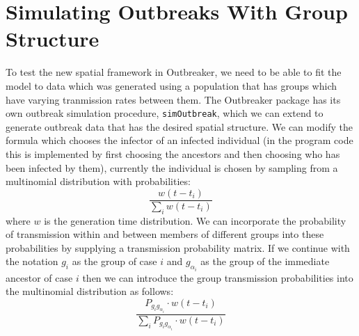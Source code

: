 \documentclass[11pt,a4paper]{report}
\begin{document}
\section{Simulating Outbreaks With Group Structure}
To test the new spatial framework in Outbreaker, we need to be able to fit the model to data which was generated using a population that has groups which have varying tranmission rates between them.
The Outbreaker package has its own outbreak simulation procedure, {\tt simOutbreak}, which we can extend to generate outbreak data that has the desired spatial structure. We can modify the formula which chooses the infector of an infected individual (in the program code this is implemented by first choosing the ancestors and then choosing who has been infected by them), currently the individual is chosen by sampling from a multinomial distribution with probabilities:
\[ \frac{w(t-t_i)}{\sum_i{w(t-t_i)}} \]
where $w$ is the generation time distribution. We can incorporate the probability of transmission within and between members of different groups into these probabilities by supplying a transmission probability matrix. If we continue with the notation $g_{i}$ as the group of case $i$ and $g_{\alpha_{i}}$ as the group of the immediate ancestor of case $i$ then we can introduce the group transmission probabilities into the multinomial distribution as follows:
\[ \frac{P_{g_{i}g_{\alpha_{i}}} \cdot w(t-t_i)}{\sum_i{P_{g_{i}g_{\alpha_{i}}} \cdot w(t-t_i)}}\]
\end{document}
